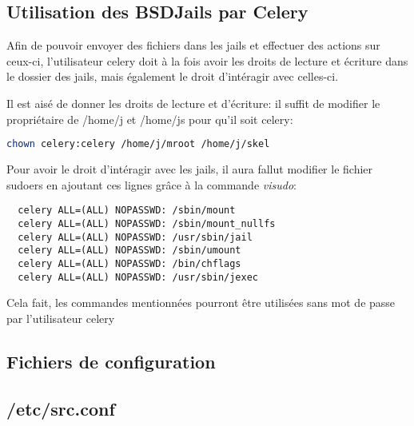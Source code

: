 \documentclass[10pt,a4paper]{article}
\begin{document}
\subsection{Utilisation des BSDJails par Celery}
Afin de pouvoir envoyer des fichiers dans les jails et effectuer des actions sur ceux-ci, l'utilisateur celery doit à la fois avoir les droits de lecture et écriture dans le dossier des jails, mais également le droit d'intéragir avec celles-ci.

Il est aisé de donner les droits de lecture et d'écriture: il suffit de modifier le propriétaire de /home/j et /home/js pour qu'il soit celery:
\begin{lstlisting}[language=bash]
  chown celery:celery /home/j/mroot /home/j/skel
\end{lstlisting}

Pour avoir le droit d'intéragir avec les jails, il aura fallut modifier le fichier sudoers
en ajoutant ces lignes grâce à la commande \emph{visudo}:
\begin{lstlisting}
  celery ALL=(ALL) NOPASSWD: /sbin/mount
  celery ALL=(ALL) NOPASSWD: /sbin/mount_nullfs
  celery ALL=(ALL) NOPASSWD: /usr/sbin/jail
  celery ALL=(ALL) NOPASSWD: /sbin/umount
  celery ALL=(ALL) NOPASSWD: /bin/chflags
  celery ALL=(ALL) NOPASSWD: /usr/sbin/jexec
\end{lstlisting}
Cela fait, les commandes mentionnées pourront être utilisées sans mot de passe par l'utilisateur celery


\newpage
\begin{appendices}
  \section{Fichiers de configuration}
  \subsection{/etc/src.conf}
  \label{sub:etc-src-conf}
  
\end{appendices}
\end{document}
